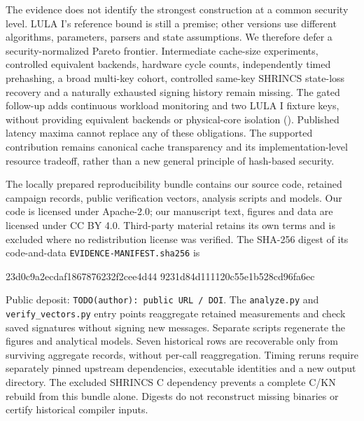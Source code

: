 The evidence does not identify the strongest construction at a common security level. LULA I's reference bound is still a premise; other versions use different algorithms, parameters, parsers and state assumptions. We therefore defer a security-normalized Pareto frontier. Intermediate cache-size experiments, controlled equivalent backends, hardware cycle counts, independently timed prehashing, a broad multi-key cohort, controlled same-key SHRINCS state-loss recovery and a naturally exhausted signing history remain missing. The gated follow-up adds continuous workload monitoring and two LULA I fixture keys, without providing equivalent backends or physical-core isolation (). Published latency maxima cannot replace any of these obligations. The supported contribution remains canonical cache transparency and its implementation-level resource tradeoff, rather than a new general principle of hash-based security.

The locally prepared reproducibility bundle contains our source code, retained campaign records, public verification vectors, analysis scripts and models. Our code is licensed under Apache-2.0; our manuscript text, figures and data are licensed under CC BY 4.0. Third-party material retains its own terms and is excluded where no redistribution license was verified. The SHA-256 digest of its code-and-data \texttt{EVIDENCE-MANIFEST.sha256} is
\begin{center}\small\ttfamily
23d0c9a2ecdaf1867876232f2cee4d44\allowbreak
9231d84d111120c55e1b528cd96fa6ec
\end{center}

Public deposit: \texttt{TODO(author): public URL / DOI}. %
The \texttt{analyze.py} and \texttt{verify\_vectors.py} entry points reaggregate retained measurements and check saved signatures without signing new messages. Separate scripts regenerate the figures and analytical models. Seven historical rows are recoverable only from surviving aggregate records, without per-call reaggregation. Timing reruns require separately pinned upstream dependencies, executable identities and a new output directory. The excluded SHRINCS C dependency prevents a complete C/KN rebuild from this bundle alone. Digests do not reconstruct missing binaries or certify historical compiler inputs.
